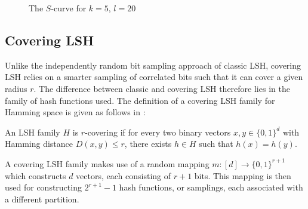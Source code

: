 \begin{figure}[ht]

  \caption{The $S$-curve for $k = 5$, $l = 20$}
\end{figure}

\subsection{Covering LSH}
\label{background-covering-lsh}

Unlike the independently random bit sampling approach of classic LSH, covering LSH relies on a smarter sampling of correlated bits such that it can cover a given radius $r$. The difference between classic and covering LSH therefore lies in the family of hash functions used. The definition of a covering LSH family for Hamming space is given as follows in \cite{DBLP:journals/corr/PhamP16}:

\begin{definition}
  An LSH family $H$ is $r$-covering if for every two binary vectors $x, y \in \{0, 1\}^d$ with Hamming distance $D(x, y) \leq r$, there exists $h \in H$ such that $h(x) = h(y)$.
\end{definition}

A covering LSH family makes use of a random mapping $m \colon [d] \rightarrow \{0, 1\}^{r + 1}$ which constructs $d$ vectors, each consisting of $r + 1$ bits. This mapping is then used for constructing $2^{r + 1} - 1$ hash functions, or samplings, each associated with a different partition.
